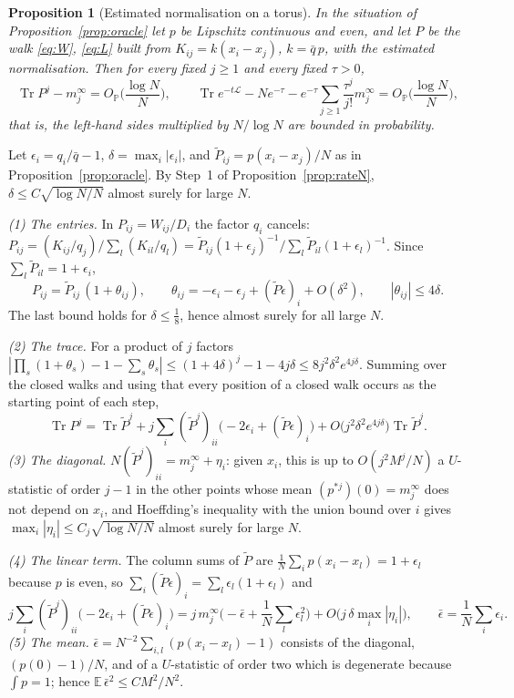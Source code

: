 \documentclass[11pt,a4paper]{article}
\makeatletter
\theoremstyle{stmt}
\newtheorem{proposition}[theorem]{Proposition}
\theoremstyle{defn}
\theoremstyle{rmk}
\renewenvironment{proof}[1][\proofname]{\par\pushQED{\qed}\normalfont\topsep6\p@\@plus6\p@\relax
  \trivlist\item[\hskip\labelsep{\sffamily\itshape\small #1.}]\ignorespaces}{\popQED\endtrivlist\@endpefalse}
\numberwithin{equation}{section}
\DeclareMathOperator{\Tr}{Tr}
\newcommand{\Lc}{\mathcal{L}}
\makeatother
\begin{document}
{\begin{proposition}[Estimated normalisation on a torus]\label{prop:estimated}
In the situation of Proposition~\ref{prop:oracle} let $p$ be Lipschitz continuous and even, and let $P$ be the walk \eqref{eq:W}, \eqref{eq:L} built from $K_{ij}=k(x_i-x_j)$, $k=\bar q\,p$, with the estimated normalisation. Then for every fixed $j\ge1$ and every fixed $\tau>0$,
\[
\Tr P^j-m_j^\infty=O_{\mathbb P}\Big(\frac{\log N}{N}\Big),\qquad\Tr e^{-t\Lc}-Ne^{-\tau}-e^{-\tau}\sum_{j\ge1}\frac{\tau^j}{j!}m_j^\infty=O_{\mathbb P}\Big(\frac{\log N}{N}\Big),
\]
that is, the left-hand sides multiplied by $N/\log N$ are bounded in probability.
\end{proposition}

\begin{proof}
Let $\epsilon_i=q_i/\bar q-1$, $\delta=\max_i|\epsilon_i|$, and $\tilde P_{ij}=p(x_i-x_j)/N$ as in Proposition~\ref{prop:oracle}. By Step~1 of Proposition~\ref{prop:rateN}, $\delta\le C\sqrt{\log N/N}$ almost surely for large $N$.

\emph{(1) The entries.} In $P_{ij}=W_{ij}/D_i$ the factor $q_i$ cancels: $P_{ij}=(K_{ij}/q_j)/\sum_l(K_{il}/q_l)=\tilde P_{ij}(1+\epsilon_j)^{-1}/\sum_l\tilde P_{il}(1+\epsilon_l)^{-1}$. Since $\sum_l\tilde P_{il}=1+\epsilon_i$,
\[
P_{ij}=\tilde P_{ij}\,(1+\theta_{ij}),\qquad\theta_{ij}=-\epsilon_i-\epsilon_j+(\tilde P\epsilon)_i+O(\delta^2),\qquad|\theta_{ij}|\le4\delta .
\]
The last bound holds for $\delta\le\frac18$, hence almost surely for all large $N$.

\emph{(2) The trace.} For a product of $j$ factors $|\prod_s(1+\theta_s)-1-\sum_s\theta_s|\le(1+4\delta)^j-1-4j\delta\le8j^2\delta^2e^{4j\delta}$. Summing over the closed walks and using that every position of a closed walk occurs as the starting point of each step,
\[
\Tr P^j=\Tr\tilde P^j+j\sum_i(\tilde P^j)_{ii}\big(-2\epsilon_i+(\tilde P\epsilon)_i\big)+O\big(j^2\delta^2e^{4j\delta}\big)\Tr\tilde P^j .
\]
\emph{(3) The diagonal.} $N(\tilde P^j)_{ii}=m_j^\infty+\eta_i$: given $x_i$, this is up to $O(j^2M^j/N)$ a $U$-statistic of order $j-1$ in the other points whose mean $(p^{*j})(0)=m_j^\infty$ does not depend on $x_i$, and Hoeffding's inequality with the union bound over $i$ gives $\max_i|\eta_i|\le C_j\sqrt{\log N/N}$ almost surely for large $N$.

\emph{(4) The linear term.} The column sums of $\tilde P$ are $\frac1N\sum_ip(x_i-x_l)=1+\epsilon_l$ because $p$ is even, so $\sum_i(\tilde P\epsilon)_i=\sum_l\epsilon_l(1+\epsilon_l)$ and
\[
j\sum_i(\tilde P^j)_{ii}\big(-2\epsilon_i+(\tilde P\epsilon)_i\big)=j\,m_j^\infty\Big(-\bar\epsilon+\frac1N\sum_l\epsilon_l^2\Big)+O\big(j\,\delta\max_i|\eta_i|\big),\qquad\bar\epsilon=\frac1N\sum_i\epsilon_i .
\]
\emph{(5) The mean.} $\bar\epsilon=N^{-2}\sum_{i,l}(p(x_i-x_l)-1)$ consists of the diagonal, $(p(0)-1)/N$, and of a $U$-statistic of order two which is degenerate because $\int p=1$; hence $\mathbb E\,\bar\epsilon^2\le CM^2/N^2$.


\end{proof}}
\end{document}

